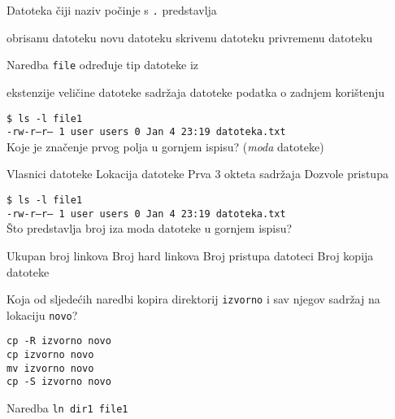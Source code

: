 \documentclass[a4paper,11pt]{exam}
\newcommand{\shell}[1]{\texttt{#1}}
\begin{document}
\begin{questions}
	\question
	Datoteka čiji naziv počinje s \shell{.} predstavlja
	
	\begin{oneparchoices}
		\choice obrisanu datoteku
		\choice novu datoteku
		\CorrectChoice skrivenu datoteku
		\choice privremenu datoteku
	\end{oneparchoices}
	
	\question	
	Naredba \shell{file} određuje tip datoteke iz
	
	\begin{oneparchoices}
		\choice ekstenzije 
		\choice veličine datoteke 
		\CorrectChoice sadržaja datoteke 
		\choice podatka o zadnjem korištenju 
	\end{oneparchoices}
	
	\question
	\shell{\$ ls -l file1} \\
	\shell{-rw-r--r-- 1 user users 0 Jan 4 23:19 datoteka.txt} \\
	Koje je značenje prvog polja u gornjem ispisu? (\textit{moda} datoteke)
	
	\begin{oneparchoices}
		\choice Vlasnici datoteke
		\choice Lokacija datoteke
		\choice Prva 3 okteta sadržaja
		\CorrectChoice Dozvole pristupa
	\end{oneparchoices}
	
	\question
	\shell{\$ ls -l file1} \\
	\shell{-rw-r--r-- 1 user users 0 Jan 4 23:19 datoteka.txt} \\
	Što predstavlja broj iza moda datoteke u gornjem ispisu?
	
	\begin{oneparchoices}
		\choice Ukupan broj linkova 
		\CorrectChoice Broj hard linkova 
		\choice Broj pristupa datoteci 
		\choice Broj kopija datoteke 
	\end{oneparchoices}
	
	\question
	Koja od sljedećih naredbi kopira direktorij \shell{izvorno} i sav njegov sadržaj na lokaciju \shell{novo}?
	
	\begin{oneparchoices}
		\CorrectChoice \shell{cp -R izvorno novo} \\
		\choice \shell{cp izvorno novo} \\
		\choice \shell{mv izvorno novo} \\
		\choice \shell{cp -S izvorno novo}
	\end{oneparchoices}
	
	\question
	Naredba \shell{ln dir1 file1}
	

\end{questions}
\end{document}
